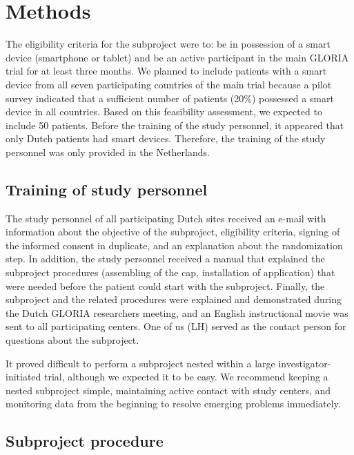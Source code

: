 \documentclass[twocolumn, issue, empirical, authordate]{jote-new-article}
\begin{document}
\section{Methods}

 The eligibility criteria for the subproject were to: be in possession of a smart device (smartphone or tablet) and be an active participant in the main GLORIA trial for at least three months. We planned to include patients with a smart device from all seven participating countries of the main trial because a pilot survey indicated that a sufficient number of patients (20\%) possessed a smart device in all countries. Based on this feasibility assessment, we expected to include 50 patients.
 Before the training of the study personnel, it appeared that only Dutch patients had smart devices. Therefore, the training of the study personnel was only provided in the Netherlands.


\subsection{Training of study personnel}

 The study personnel of all participating Dutch sites received an e-mail with information about the objective of the subproject, eligibility criteria, signing of the informed consent in duplicate, and an explanation about the randomization step. In addition, the study personnel received a manual that explained the subproject procedures (assembling of the cap, installation of application) that were needed before the patient could start with the subproject. Finally, the subproject and the related procedures were explained and demonstrated during the Dutch GLORIA researchers meeting, and an English instructional movie was sent to all participating centers. One of us (LH) served as the contact person for questions about the subproject.




\begin{takeHomeMessage}
 It proved difficult to perform a subproject nested within a large investigator-initiated trial, although we expected it to be easy. We recommend keeping a nested subproject simple, maintaining active contact with study centers, and monitoring data from the beginning to resolve emerging problems immediately.
\end{takeHomeMessage}

\subsection{Subproject procedure}
\end{document}
